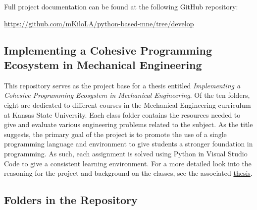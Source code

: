 Full project documentation can be found at the following GitHub repository: 

\begin{center}
    \url{https://github.com/mKiloLA/python-based-mne/tree/develop}
\end{center}

\subsection*{Implementing a Cohesive Programming Ecosystem in Mechanical Engineering}

This repository serves as the project base for a thesis entitled
\textit{Implementing a Cohesive Programming Ecosystem in Mechanical Engineering}. 
Of the ten folders, eight are dedicated to different courses in the Mechanical 
Engineering curriculum at Kansas State University. Each class folder contains the 
resources needed to give and evaluate various engineering problems related to the 
subject. As the title suggests, the primary goal of the project is to promote the 
use of a single programming language and environment to give students a stronger 
foundation in programming. As such, each assignment is solved using Python in Visual 
Studio Code to give a consistent learning environment. For a more detailed look into 
the reasoning for the project and background on the classes, see the associated 
\href{https://github.com/mKiloLA/python-based-mne/tree/develop/thesis}{thesis}.

\subsection*{Folders in the Repository}

